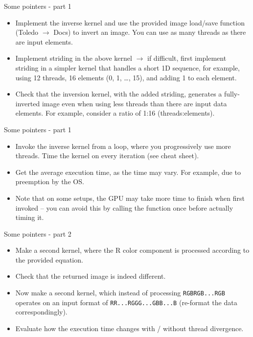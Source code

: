 \documentclass[11pt,t]{beamer}
\newcommand{\inline}[1]{ \colorbox{mygray}{\lstinline{#1}}}
\begin{document}
\begin{frame}{Some pointers - part 1}

\begin{itemize}\setlength\itemsep{1em}
    \item Implement the inverse kernel and use the provided image load/save function (Toledo $\rightarrow$ Docs) to invert an image. You can use as many threads as there are input elements.
    \item Implement striding in the above kernel $\rightarrow$ if difficult, first implement striding in a simpler kernel that handles a short 1D sequence, for example, using 12 threads, 16 elements (0, 1, \dots, 15), and adding 1 to each element.
    \item Check that the inversion kernel, with the added striding, generates a fully-inverted image even when using less threads than there are input data elements. For example, consider a ratio of 1:16 (threads:elements).
\end{itemize}
    
\end{frame}


\begin{frame}{Some pointers - part 1}

\begin{itemize}\setlength\itemsep{1em}
    \item Invoke the inverse kernel from a loop, where you progressively use more threads. Time the kernel on every iteration (see cheat sheet).
    \item Get the average execution time, as the time may vary. For example, due to preemption by the OS. 
    \item Note that on some setups, the GPU may take more time to finish when first invoked -- you can avoid this by calling the function once before actually timing it.
\end{itemize}
    
\end{frame}


\begin{frame}{Some pointers - part 2}

\begin{itemize}\setlength\itemsep{1em}
    \item Make a second kernel, where the R color component is processed according to the provided equation. 
    \item Check that the returned image is indeed different.
    \item Now make a second kernel, which instead of processing \inline{RGBRGB...RGB} operates on an input format of \inline{RR...RGGG...GBB...B} (re-format the data correspondingly).
    \item Evaluate how the execution time changes with / without thread divergence.
\end{itemize}
    
\end{frame}
\end{document}
